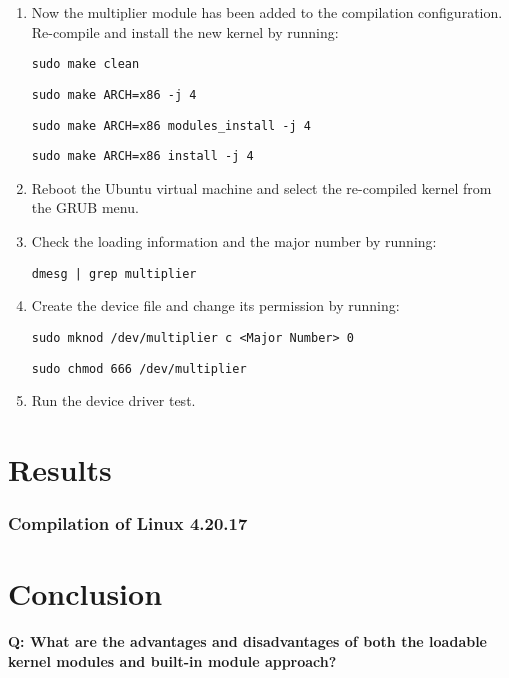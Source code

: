 \documentclass[11pt,letterpaper,titlepage]{article}
\begin{document}
\begin{enumerate}
    \item Now the multiplier module has been added to the compilation configuration. Re-compile and install the new kernel by running:
    
    \texttt{sudo make clean}
    
    \texttt{sudo make ARCH=x86 -j 4}
    
    \texttt{sudo make ARCH=x86 modules\_install -j 4}
    
    \texttt{sudo make ARCH=x86 install -j 4}
    
    \item Reboot the Ubuntu virtual machine and select the re-compiled kernel from the GRUB menu.
    
    \item Check the loading information and the major number by running:
    
    \texttt{dmesg | grep multiplier}
    
    \item Create the device file and change its permission by running:
    
    \texttt{sudo mknod /dev/multiplier c <Major Number> 0}
    
    \texttt{sudo chmod 666 /dev/multiplier}
    
    \item Run the device driver test.
    
\end{enumerate}

\newpage

\part{Results}

\section{Compilation of Linux 4.20.17}

\section{}

\newpage

\part{Conclusion}

\textbf{Q: What are the advantages and disadvantages of both the loadable kernel modules and
built-in module approach?}
\end{document}
